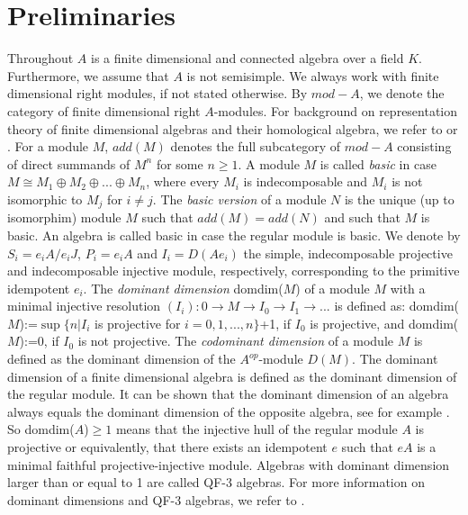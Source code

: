 \documentclass[a4paper]{amsart}
\theoremstyle{definition}
\theoremstyle{remark}
\numberwithin{equation}{theorem}
\begin{document}
\section{Preliminaries}
Throughout $A$ is a finite dimensional and connected algebra over a field $K$. Furthermore, we assume that $A$ is not semisimple. We always work with finite dimensional right modules, if not stated otherwise. By $mod-A$, we denote the category of finite dimensional right $A$-modules. 
For background on representation theory of finite dimensional algebras and their homological algebra, we refer to \cite{ASS} or \cite{SkoYam}.
For a module $M$, $add(M)$ denotes the full subcategory of $mod-A$ consisting of direct summands of $M^n$ for some $n \geq 1$.
A module $M$ is called \emph{basic} in case $M \cong M_1 \oplus M_2 \oplus ... \oplus M_n$, where every $M_i$ is indecomposable and $M_i$ is not isomorphic to $M_j$ for $i \neq j$. The \emph{basic version} of a module $N$ is the unique (up to isomorphim) module $M$ such that $add(M)=add(N)$ and such that $M$ is basic. An algebra is called basic in case the regular module is basic.
We denote by $S_i=e_iA/e_iJ$, $P_i=e_i A$ and $I_i=D(Ae_i)$  the simple, indecomposable projective and indecomposable injective module, respectively, corresponding to the primitive idempotent $e_i$. \newline
The \emph{dominant dimension} domdim($M$) of a module $M$ with a minimal injective resolution \newline $(I_i): 0 \rightarrow M \rightarrow I_0 \rightarrow I_1 \rightarrow ...$ is defined as: \newline
domdim($M$):=$\sup \{ n | I_i $ is projective for $i=0,1,...,n \}$+1, if $I_0$ is projective, and \newline domdim($M$):=0, if $I_0$ is not projective. \newline
The \emph{codominant dimension} of a module $M$ is defined as the dominant dimension of the $A^{op}$-module $D(M)$.
The dominant dimension of a finite dimensional algebra is defined as the dominant dimension of the regular module. It can be shown that the dominant dimension of an algebra always equals the dominant dimension of the opposite algebra, see for example \cite{Ta}.
So domdim($A$)$ \geq 1$ means that the injective hull of the regular module $A$ is projective or equivalently, that there exists an idempotent $e$ such that $eA$ is a minimal faithful projective-injective module.
Algebras with dominant dimension larger than or equal to 1 are called QF-3 algebras.
For more information on dominant dimensions and QF-3 algebras, we refer to \cite{Ta}.
\end{document}

